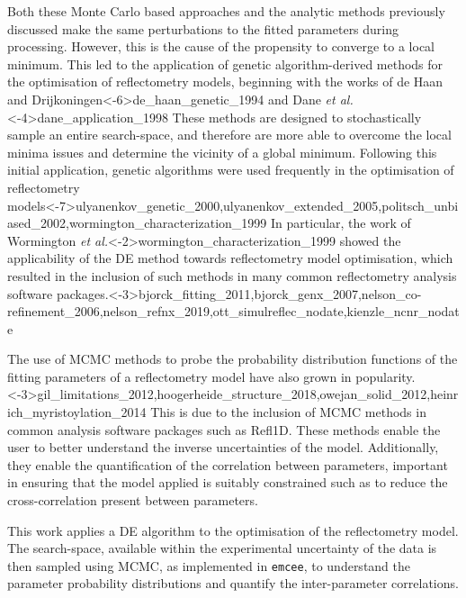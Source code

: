 Both these Monte Carlo based approaches and the analytic methods previously discussed make the same perturbations to the fitted parameters during processing.
However, this is the cause of the propensity to converge to a local minimum.
This led to the application of genetic algorithm-derived methods for the optimisation of reflectometry models, beginning with the works of de Haan and Drijkoningen\sidecite<-6\baselineskip>{de_haan_genetic_1994} and Dane \emph{et al.}\sidecite<-4\baselineskip>{dane_application_1998}
These methods are designed to stochastically sample an entire search-space, and therefore are more able to overcome the local minima issues and determine the vicinity of a global minimum.
Following this initial application, genetic algorithms were used frequently in the optimisation of reflectometry models\sidecite<-7\baselineskip>{ulyanenkov_genetic_2000,ulyanenkov_extended_2005,politsch_unbiased_2002,wormington_characterization_1999}
In particular, the work of Wormington \emph{et al.}\sidecite<-2\baselineskip>{wormington_characterization_1999} showed the applicability of the DE method towards reflectometry model optimisation, which resulted in the inclusion of such methods in many common reflectometry analysis software packages.\sidecite<-3\baselineskip>{bjorck_fitting_2011,bjorck_genx_2007,nelson_co-refinement_2006,nelson_refnx_2019,ott_simulreflec_nodate,kienzle_ncnr_nodate}

The use of MCMC methods to probe the probability distribution functions of the fitting parameters of a reflectometry model have also grown in popularity.\sidecite<-3\baselineskip>{gil_limitations_2012,hoogerheide_structure_2018,owejan_solid_2012,heinrich_myristoylation_2014}
This is due to the inclusion of MCMC methods in common analysis software packages such as Refl1D.\autocite{kienzle_ncnr_nodate}
These methods enable the user to better understand the inverse uncertainties of the model.
Additionally, they enable the quantification of the correlation between parameters, important in ensuring that the model applied is suitably constrained such as to reduce the cross-correlation present between parameters.\autocite{nelson_co-refinement_2006}

This work applies a DE algorithm\autocite{storn_differential_1997,jones_scipy_nodate} to the optimisation of the reflectometry model.
The search-space, available within the experimental uncertainty of the data is then sampled using MCMC, as implemented in \texttt{emcee},\autocite{foreman-mackey_emcee_2013} to understand the parameter probability distributions and quantify the inter-parameter correlations.

